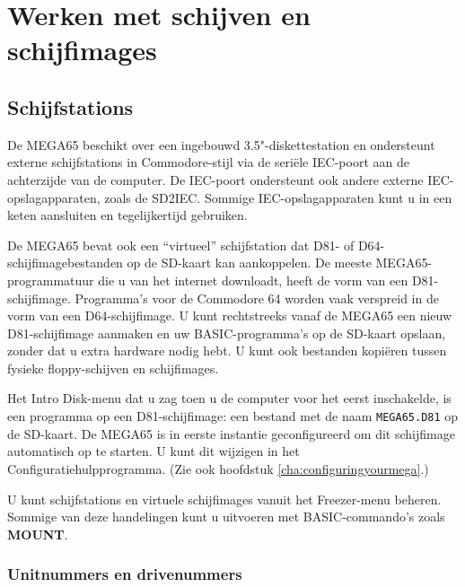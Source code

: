 \chapter{Werken met schijven en schijfimages}

\section{Schijfstations}
\label{cha:using-disks}

De MEGA65 beschikt over een ingebouwd 3.5"-diskettestation en ondersteunt externe schijfstations in Commodore-stijl via de seriële IEC-poort aan de achterzijde van de computer. De IEC-poort ondersteunt ook andere externe IEC-opslagapparaten, zoals de SD2IEC. Sommige IEC-opslagapparaten kunt u in een keten aansluiten en tegelijkertijd gebruiken.

De MEGA65 bevat ook een ``virtueel'' schijfstation dat D81- of D64-schijfimagebestanden op de SD-kaart kan aankoppelen. De meeste MEGA65-programmatuur die u van het internet downloadt, heeft de vorm van een D81-schijfimage. Programma's voor de Commodore 64 worden vaak verspreid in de vorm van een D64-schijfimage. U kunt rechtstreeks vanaf de MEGA65 een nieuw D81-schijfimage aanmaken en uw BASIC-programma's op de SD-kaart opslaan, zonder dat u extra hardware nodig hebt. U kunt ook bestanden kopiëren tussen fysieke floppy-schijven en schijfimages.

Het Intro Disk-menu dat u zag toen u de computer voor het eerst inschakelde, is een programma op een D81-schijfimage: een bestand met de naam {\tt MEGA65.D81} op de SD-kaart. De MEGA65 is in eerste instantie geconfigureerd om dit schijfimage automatisch op te starten. U kunt dit wijzigen in het Configuratiehulpprogramma. (Zie ook hoofdstuk \vref{cha:configuringyourmega}.)

U kunt schijfstations en virtuele schijfimages vanuit het Freezer-menu beheren. Sommige van deze handelingen kunt u uitvoeren met BASIC-commando's zoals {\bf MOUNT}.

\subsection{Unitnummers en drivenummers}

